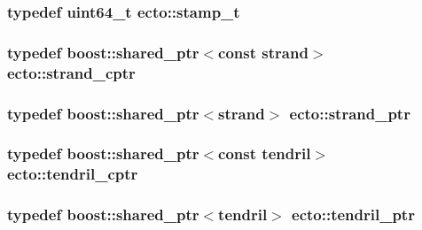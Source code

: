 \subsubsection[{\texorpdfstring{stamp\+\_\+t}{stamp_t}}]{\setlength{\rightskip}{0pt plus 5cm}typedef uint64\+\_\+t {\bf ecto\+::stamp\+\_\+t}}\hypertarget{namespaceecto_a96ba8fa498cc4b8e2a0217a9e236b50d}{}\label{namespaceecto_a96ba8fa498cc4b8e2a0217a9e236b50d}
\subsubsection[{\texorpdfstring{strand\+\_\+cptr}{strand_cptr}}]{\setlength{\rightskip}{0pt plus 5cm}typedef boost\+::shared\+\_\+ptr$<$const {\bf strand}$>$ {\bf ecto\+::strand\+\_\+cptr}}\hypertarget{namespaceecto_abbad20d834739bbf762269e4e04a6732}{}\label{namespaceecto_abbad20d834739bbf762269e4e04a6732}
\subsubsection[{\texorpdfstring{strand\+\_\+ptr}{strand_ptr}}]{\setlength{\rightskip}{0pt plus 5cm}typedef boost\+::shared\+\_\+ptr$<${\bf strand}$>$ {\bf ecto\+::strand\+\_\+ptr}}\hypertarget{namespaceecto_a98ca3b7b690de778292922c806e7588d}{}\label{namespaceecto_a98ca3b7b690de778292922c806e7588d}
\subsubsection[{\texorpdfstring{tendril\+\_\+cptr}{tendril_cptr}}]{\setlength{\rightskip}{0pt plus 5cm}typedef boost\+::shared\+\_\+ptr$<$const {\bf tendril}$>$ {\bf ecto\+::tendril\+\_\+cptr}}\hypertarget{namespaceecto_ad01f26ee47597f71a6f86ee34bb3ffe4}{}\label{namespaceecto_ad01f26ee47597f71a6f86ee34bb3ffe4}
\subsubsection[{\texorpdfstring{tendril\+\_\+ptr}{tendril_ptr}}]{\setlength{\rightskip}{0pt plus 5cm}typedef boost\+::shared\+\_\+ptr$<${\bf tendril}$>$ {\bf ecto\+::tendril\+\_\+ptr}}\hypertarget{namespaceecto_a84fb5f6130275382e5cbeb5fdececa78}{}\label{namespaceecto_a84fb5f6130275382e5cbeb5fdececa78}
